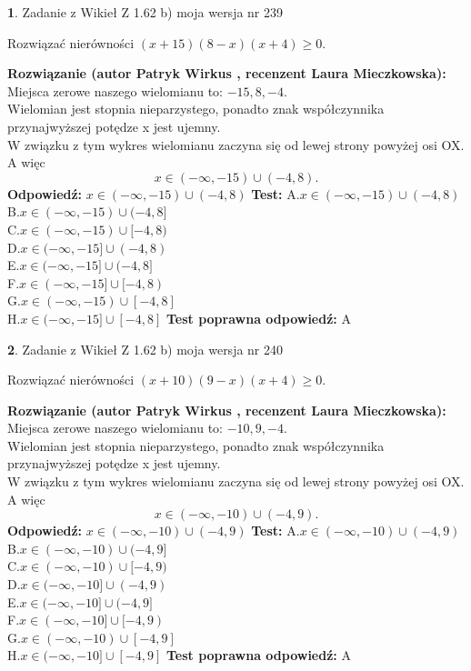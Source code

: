 \documentclass[12pt, a4paper]{article}
\theoremstyle{definition} %
\newtheorem{zad}{}
\newcommand{\zadStart}[1]{\begin{zad}#1\newline}
\newcommand{\zadStop}{\end{zad}}
\newcommand{\rozwStart}[2]{\noindent \textbf{Rozwiązanie (autor #1 , recenzent #2): }\newline}
\newcommand{\rozwStop}{\newline}
\newcommand{\odpStart}{\noindent \textbf{Odpowiedź:}\newline}
\newcommand{\odpStop}{\newline}
\newcommand{\testStart}{\noindent \textbf{Test:}\newline}
\newcommand{\testStop}{\newline}
\newcommand{\kluczStart}{\noindent \textbf{Test poprawna odpowiedź:}\newline}
\newcommand{\kluczStop}{\newline}
\begin{document}
\zadStart{Zadanie z Wikieł Z 1.62 b) moja wersja nr 239}

Rozwiązać nierówności $(x+15)(8-x)(x+4)\ge0$.
\zadStop
\rozwStart{Patryk Wirkus}{Laura Mieczkowska}
Miejsca zerowe naszego wielomianu to: $-15, 8, -4$.\\
Wielomian jest stopnia nieparzystego, ponadto znak współczynnika przy\linebreak najwyższej potędze x jest ujemny.\\ W związku z tym wykres wielomianu zaczyna się od lewej strony powyżej osi OX. A więc $$x \in (-\infty,-15) \cup (-4,8).$$
\rozwStop
\odpStart
$x \in (-\infty,-15) \cup (-4,8)$
\odpStop
\testStart
A.$x \in (-\infty,-15) \cup (-4,8)$\\
B.$x \in (-\infty,-15) \cup (-4,8]$\\
C.$x \in (-\infty,-15) \cup [-4,8)$\\
D.$x \in (-\infty,-15] \cup (-4,8)$\\
E.$x \in (-\infty,-15] \cup (-4,8]$\\
F.$x \in (-\infty,-15] \cup [-4,8)$\\
G.$x \in (-\infty,-15) \cup [-4,8]$\\
H.$x \in (-\infty,-15] \cup [-4,8]$
\testStop
\kluczStart
A
\kluczStop



\zadStart{Zadanie z Wikieł Z 1.62 b) moja wersja nr 240}

Rozwiązać nierówności $(x+10)(9-x)(x+4)\ge0$.
\zadStop
\rozwStart{Patryk Wirkus}{Laura Mieczkowska}
Miejsca zerowe naszego wielomianu to: $-10, 9, -4$.\\
Wielomian jest stopnia nieparzystego, ponadto znak współczynnika przy\linebreak najwyższej potędze x jest ujemny.\\ W związku z tym wykres wielomianu zaczyna się od lewej strony powyżej osi OX. A więc $$x \in (-\infty,-10) \cup (-4,9).$$
\rozwStop
\odpStart
$x \in (-\infty,-10) \cup (-4,9)$
\odpStop
\testStart
A.$x \in (-\infty,-10) \cup (-4,9)$\\
B.$x \in (-\infty,-10) \cup (-4,9]$\\
C.$x \in (-\infty,-10) \cup [-4,9)$\\
D.$x \in (-\infty,-10] \cup (-4,9)$\\
E.$x \in (-\infty,-10] \cup (-4,9]$\\
F.$x \in (-\infty,-10] \cup [-4,9)$\\
G.$x \in (-\infty,-10) \cup [-4,9]$\\
H.$x \in (-\infty,-10] \cup [-4,9]$
\testStop
\kluczStart
A
\kluczStop
\end{document}
